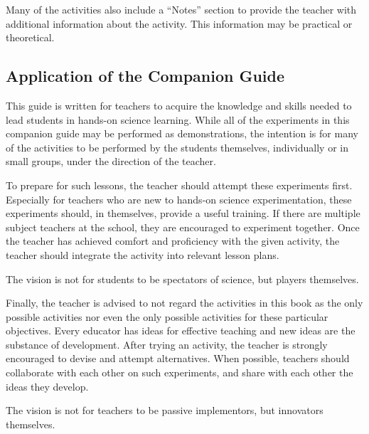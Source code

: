 Many of the activities also include a ``Notes'' section to provide the teacher with additional information about the activity. This information may be practical or theoretical.

\subsection*{Application of the Companion Guide}

This guide is written for teachers to acquire the knowledge and skills needed to lead students in hands-on science learning. While all of the experiments in this companion guide may be performed as demonstrations, the intention is for many of the activities to be performed by the students themselves, individually or in small groups, under the direction of the teacher.

To prepare for such lessons, the teacher should attempt these experiments first. Especially for teachers who are new to hands-on science experimentation, these experiments should, in themselves, provide a useful training. If there are multiple subject teachers at the school, they are encouraged to experiment together. Once the teacher has achieved comfort and proficiency with the given activity, the teacher should integrate the activity into relevant lesson plans.

The vision is not for students to be spectators of science, but players themselves.

Finally, the teacher is advised to not regard the activities in this book as the only possible activities nor even the only possible activities for these particular objectives. Every educator has ideas for effective teaching and new ideas are the substance of development. After trying an activity, the teacher is strongly encouraged to devise and attempt alternatives. When possible, teachers should collaborate with each other on such experiments, and share with each other the ideas they develop.

The vision is not for teachers to be passive implementors, but innovators themselves.
